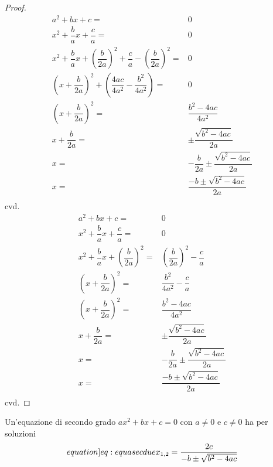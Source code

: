 \begin{proof}
\begin{align*}
	a^2+bx+c=&0\\
	x^2+\dfrac{b}{a}x+\dfrac{c}{a}=&0\\
	x^2+\dfrac{b}{a}x+\left(\dfrac{b}{2a}\right)^2+\dfrac{c}{a}-\left(\dfrac{b}{2a}\right)^2=&0\\
	\left(x+\dfrac{b}{2a}\right)^2+\left(\dfrac{4ac}{4a^2}-\dfrac{b^2}{4a^2}\right)=&0\\
	\left(x+\dfrac{b}{2a}\right)^2=&\dfrac{b^2-4ac}{4a^2}\\
	x+\dfrac{b}{2a}=&\pm\dfrac{\sqrt{b^2-4ac}}{2a}\\
	x=&-\dfrac{b}{2a}\pm\dfrac{\sqrt{b^2-4ac}}{2a}\\
	x=&\dfrac{-b\pm\sqrt{b^2-4ac}}{2a}\\
\end{align*}
cvd.
\begin{align*}
	a^2+bx+c=&0\\
	x^2+\dfrac{b}{a}x+\dfrac{c}{a}=&0\\ 
	x^2+\dfrac{b}{a}x+\left(\dfrac{b}{2a}\right)^2=&\left(\dfrac{b}{2a}\right)^2-\dfrac{c}{a}\\
	\left(x+\dfrac{b}{2a}\right)^2=&\dfrac{b^2}{4a^2}-\dfrac{c}{a}\\
	\left(x+\dfrac{b}{2a}\right)^2=&\dfrac{b^2-4ac}{4a^2}\\
	x+\dfrac{b}{2a}=&\pm\dfrac{\sqrt{b^2-4ac}}{2a}\\
	x=&-\dfrac{b}{2a}\pm\dfrac{\sqrt{b^2-4ac}}{2a}\\
	x=&\dfrac{-b\pm\sqrt{b^2-4ac}}{2a}\\
\end{align*}
cvd.
\end{proof}
\begin{thm}\label{thm:Equasecdue}
	Un'equazione di secondo grado $ax^2+bx+c=0$ con $a\neq 0$ e $c\neq 0$ ha 
	per soluzioni \begin{equation*}\label[equation]{eq:equasecdue}
		x_{1,2}=\dfrac{2c}{-b\pm\sqrt{b^2-4ac}}
	\end{equation*}
\end{thm}\cite{Wilson2022}

